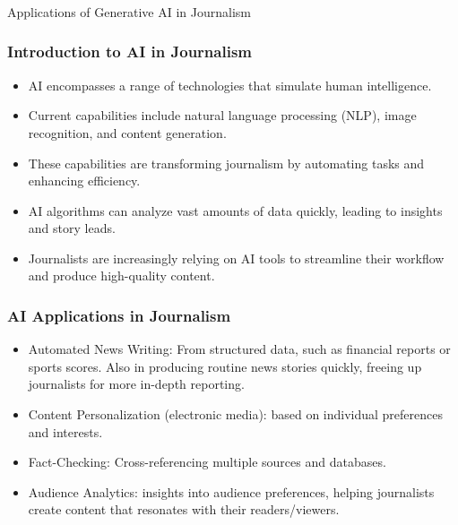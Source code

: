 \begin{frame}[fragile]\frametitle{}
\begin{center}
{\Large Applications of Generative AI in Journalism}
\end{center}
\end{frame}

\begin{frame}[fragile]\frametitle{Introduction to AI in Journalism}

\begin{itemize}
\item AI encompasses a range of technologies that simulate human intelligence.
\item Current capabilities include natural language processing (NLP), image recognition, and content generation.
\item These capabilities are transforming journalism by automating tasks and enhancing efficiency.
\item AI algorithms can analyze vast amounts of data quickly, leading to insights and story leads.
\item Journalists are increasingly relying on AI tools to streamline their workflow and produce high-quality content.
\end{itemize}

\end{frame}

\begin{frame}[fragile]\frametitle{AI Applications in Journalism}

\begin{itemize}
\item Automated News Writing:  From structured data, such as financial reports or sports scores. Also in producing routine news stories quickly, freeing up journalists for more in-depth reporting.
\item Content Personalization (electronic media): based on individual preferences and interests.
\item Fact-Checking: Cross-referencing multiple sources and databases.
\item Audience Analytics: insights into audience preferences, helping journalists create content that resonates with their readers/viewers.
\end{itemize}

\end{frame}

